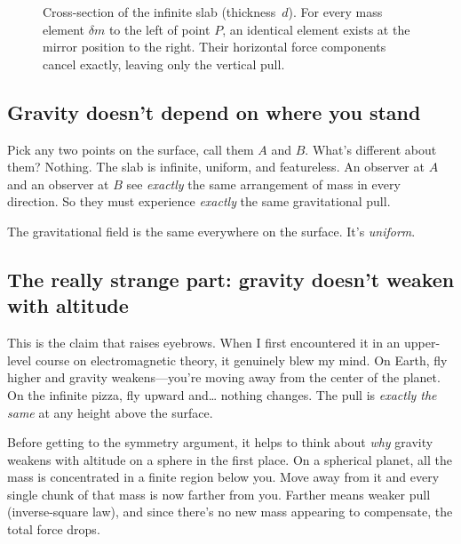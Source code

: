 \documentclass[11pt, letterpaper]{article}
\begin{document}
\begin{figure}[ht]
\caption{Cross-section of the infinite slab (thickness~$d$). For every mass element $\delta m$ to the left of point $P$, an identical element exists at the mirror position to the right. Their horizontal force components cancel exactly, leaving only the vertical pull.}
\label{fig:symmetry}
\end{figure}

\subsection{Gravity doesn't depend on where you stand}

Pick any two points on the surface, call them $A$ and $B$. What's different about them? Nothing. The slab is infinite, uniform, and featureless. An observer at $A$ and an observer at $B$ see \textit{exactly} the same arrangement of mass in every direction. So they must experience \textit{exactly} the same gravitational pull.

The gravitational field is the same everywhere on the surface. It's \textit{uniform}.

\subsection{The really strange part: gravity doesn't weaken with altitude}

This is the claim that raises eyebrows. When I first encountered it in an upper-level course on electromagnetic theory, it genuinely blew my mind. On Earth, fly higher and gravity weakens---you're moving away from the center of the planet. On the infinite pizza, fly upward and\ldots{} nothing changes. The pull is \textit{exactly the same} at any height above the surface.

Before getting to the symmetry argument, it helps to think about \textit{why} gravity weakens with altitude on a sphere in the first place. On a spherical planet, all the mass is concentrated in a finite region below you. Move away from it and every single chunk of that mass is now farther from you. Farther means weaker pull (inverse-square law), and since there's no new mass appearing to compensate, the total force drops.
\end{document}
